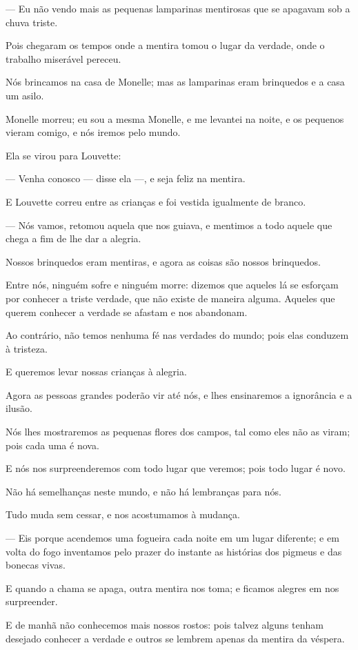 --- Eu não vendo mais as pequenas lamparinas mentirosas que se apagavam
sob a chuva triste.

Pois chegaram os tempos onde a mentira tomou o lugar da verdade, onde o
trabalho miserável pereceu.

Nós brincamos na casa de Monelle; mas as lamparinas eram brinquedos e a
casa um asilo.

Monelle morreu; eu sou a mesma Monelle, e me levantei na noite, e os
pequenos vieram comigo, e nós iremos pelo mundo.

Ela se virou para Louvette:

--- Venha conosco --- disse ela ---, e seja feliz na mentira.

E Louvette correu entre as crianças e foi vestida igualmente de branco.

--- Nós vamos, retomou aquela que nos guiava, e mentimos a todo aquele
que chega a fim de lhe dar a alegria.

Nossos brinquedos eram mentiras, e agora as coisas são nossos
brinquedos.

Entre nós, ninguém sofre e ninguém morre: dizemos que aqueles lá se
esforçam por conhecer a triste verdade, que não existe de maneira alguma.
Aqueles que querem conhecer a verdade se afastam e nos abandonam.

Ao contrário, não temos nenhuma fé nas verdades do mundo; pois elas
conduzem à tristeza.

E queremos levar nossas crianças à alegria.

Agora as pessoas grandes poderão vir até nós, e lhes ensinaremos a
ignorância e a ilusão.

Nós lhes mostraremos as pequenas flores dos campos, tal como eles não
as viram; pois cada uma é nova.

E nós nos surpreenderemos com todo lugar que veremos; pois todo lugar é
novo.

Não há semelhanças neste mundo, e não há lembranças para nós.

Tudo muda sem cessar, e nos acostumamos à mudança.

--- Eis porque acendemos uma fogueira cada noite em um lugar diferente;
e em volta do fogo inventamos pelo prazer do instante as histórias dos
pigmeus e das bonecas vivas.

E quando a chama se apaga, outra mentira nos toma; e ficamos alegres em
nos surpreender.

E de manhã não conhecemos mais nossos rostos: pois talvez alguns tenham
desejado conhecer a verdade e outros se lembrem apenas da mentira da
véspera.

